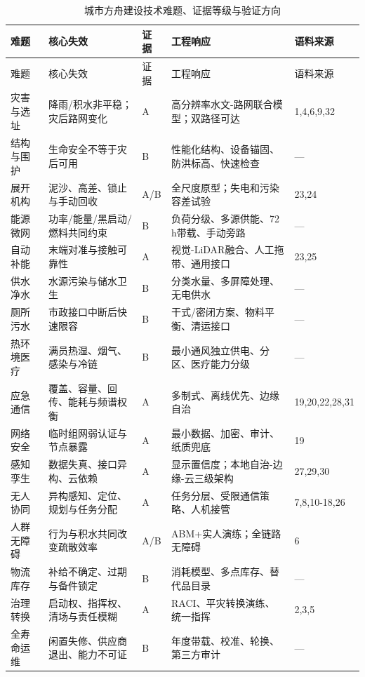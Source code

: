 \documentclass[UTF8,a4paper,zihao=-4]{ctexart}
\begin{document}
\begin{longtable}{p{20mm}p{37mm}p{9mm}p{50mm}p{22mm}}
\caption{城市方舟建设技术难题、证据等级与验证方向}\\\toprule
难题 & 核心失效 & 证据 & 工程响应 & 语料来源\\\midrule\endfirsthead
\toprule 难题 & 核心失效 & 证据 & 工程响应 & 语料来源\\\midrule\endhead

灾害与选址 & 降雨/积水非平稳；灾后路网变化 & A & 高分辨率水文-路网联合模型；双路径可达 & 1,4,6,9,32\\

结构与围护 & 生命安全不等于灾后可用 & B & 性能化结构、设备锚固、防洪标高、快速检查 & —\\

展开机构 & 泥沙、高差、锁止与手动回收 & A/B & 全尺度原型；失电和污染容差试验 & 23,24\\

能源微网 & 功率/能量/黑启动/燃料共同约束 & B & 负荷分级、多源供能、72 h带载、手动旁路 & —\\

自动补能 & 末端对准与接触可靠性 & A & 视觉-LiDAR融合、人工拖带、通用接口 & 23,25\\

供水净水 & 水源污染与储水卫生 & B & 分类水量、多屏障处理、无电供水 & —\\

厕所污水 & 市政接口中断后快速限容 & B & 干式/密闭方案、物料平衡、清运接口 & —\\

热环境医疗 & 满员热湿、烟气、感染与冷链 & B & 最小通风独立供电、分区、医疗能力分级 & —\\

应急通信 & 覆盖、容量、回传、能耗与频谱权衡 & A & 多制式、离线优先、边缘自治 & 19,20,22,28,31\\

网络安全 & 临时组网弱认证与节点暴露 & A & 最小数据、加密、审计、纸质兜底 & 19\\

感知孪生 & 数据失真、接口异构、云依赖 & A & 显示置信度；本地自治-边缘-云三级架构 & 27,29,30\\

无人协同 & 异构感知、定位、规划与任务分配 & A & 任务分层、受限通信策略、人机接管 & 7,8,10-18,26\\

人群无障碍 & 行为与积水共同改变疏散效率 & A/B & ABM+实人演练；全链路无障碍 & 6\\

物流库存 & 补给不确定、过期与备件锁定 & B & 消耗模型、多点库存、替代品目录 & —\\

治理转换 & 启动权、指挥权、清场与责任模糊 & A & RACI、平灾转换演练、统一指挥 & 2,3,5\\

全寿命运维 & 闲置失修、供应商退出、能力不可证 & B & 年度带载、校准、轮换、第三方审计 & —\\

\bottomrule\end{longtable}
\end{document}
